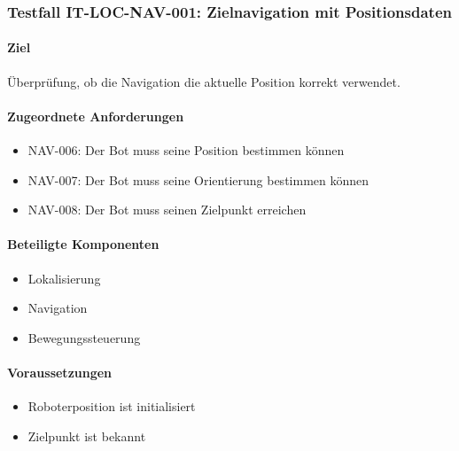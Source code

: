 \subsubsection{Testfall IT-LOC-NAV-001: Zielnavigation mit
Positionsdaten}\label{testfall-it-loc-nav-001-zielnavigation-mit-positionsdaten}

\paragraph{Ziel}\label{ziel-10}

Überprüfung, ob die Navigation die aktuelle Position korrekt verwendet.

\paragraph{Zugeordnete
Anforderungen}\label{zugeordnete-anforderungen-10}

\begin{itemize}
\tightlist
\item
  NAV-006: Der Bot muss seine Position bestimmen können
\item
  NAV-007: Der Bot muss seine Orientierung bestimmen können
\item
  NAV-008: Der Bot muss seinen Zielpunkt erreichen
\end{itemize}

\paragraph{Beteiligte Komponenten}\label{beteiligte-komponenten-1}

\begin{itemize}
\tightlist
\item
  Lokalisierung
\item
  Navigation
\item
  Bewegungssteuerung
\end{itemize}

\paragraph{Voraussetzungen}\label{voraussetzungen-10}

\begin{itemize}
\tightlist
\item
  Roboterposition ist initialisiert
\item
  Zielpunkt ist bekannt
\end{itemize}

